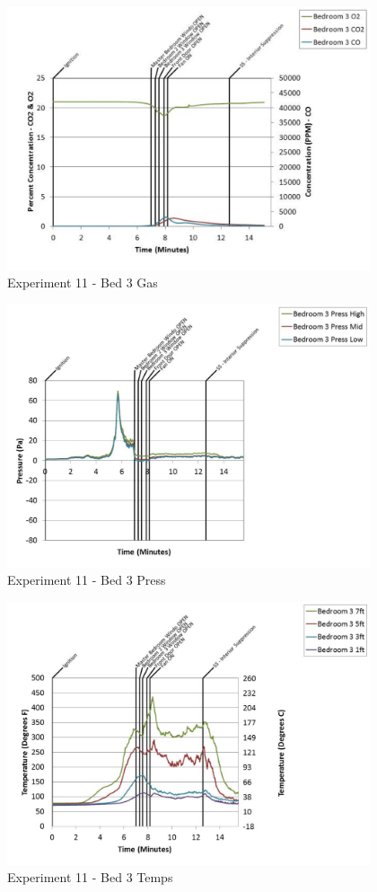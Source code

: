 \documentclass{article}
\begin{document}
\begin{appendices}
	\clearpage

	\begin{figure}[h!]
		\centering
		\includegraphics[height=3.05in]{0_Images/Results_Charts/Exp_11_Charts/Bed3Gas.pdf}
		\caption{Experiment 11 - Bed 3 Gas}
	\end{figure}
 

	\begin{figure}[h!]
		\centering
		\includegraphics[height=3.05in]{0_Images/Results_Charts/Exp_11_Charts/Bed3Press.pdf}
		\caption{Experiment 11 - Bed 3 Press}
	\end{figure}
 
	\clearpage

	\begin{figure}[h!]
		\centering
		\includegraphics[height=3.05in]{0_Images/Results_Charts/Exp_11_Charts/Bed3Temps.pdf}
		\caption{Experiment 11 - Bed 3 Temps}
	\end{figure}
 


\end{appendices}
\end{document}
